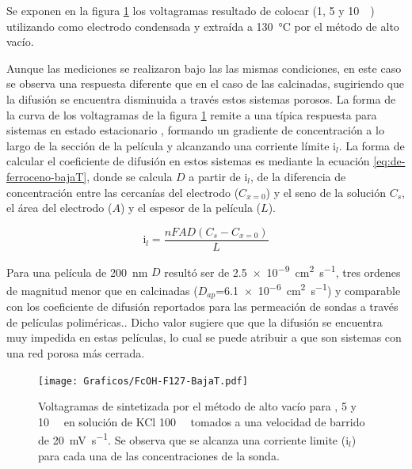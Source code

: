 		Se exponen en la figura \ref{fig:fcoh_bajaT} los voltagramas resultado de colocar \fc\space (1, 5 y \SI{10}{\milli\Molar}) utilizando como electrodo \pdmF\space condensada y extraída a \SI{130}{\celsius} por el método de alto vacío. 
			
		Aunque las mediciones se realizaron bajo las las mismas condiciones, en este caso se observa una respuesta diferente que en el caso de las \pdmF\space calcinadas, sugiriendo que la difusión se encuentra disminuida a través estos sistemas porosos. La forma de la curva de los voltagramas de la figura \ref{fig:fcoh_bajaT} remite a una típica respuesta para sistemas en estado estacionario	, formando un gradiente de concentración a lo largo de la sección de la película y alcanzando una corriente límite $\text{i}_l$. 
		La forma de calcular el coeficiente de difusión en estos sistemas es mediante la ecuación \ref{eq:de-ferroceno-bajaT}, donde se calcula $D$ a partir de $\text{i}_l$, de la diferencia de concentración entre las cercanías del electrodo ($C_{x=0}$) y el seno de la solución $C_s$, el área del electrodo ($A$) y el espesor de la película ($L$).

			\begin{equation}
					\text{i}_l = \frac{nFAD(C_{s}-C_{x=0})}{L}
					\label{eq:de-ferroceno-bajaT}
			\end{equation}
			  	

		Para una película de \SI{200}{nm} $D$ resultó ser de \SI{2.5e-9}{\square\cm\per\second}, tres ordenes de magnitud menor que en \pdmF\space calcinadas ($D_{ap}$=\SI{6,1e-6}{\square\cm\per\second}) y comparable con los coeficiente de difusión reportados para las permeación de sondas a través de películas poliméricas.\cite{Kolb1993}. Dicho valor sugiere que que la difusión se encuentra muy impedida en estas películas, lo cual se puede atribuir a que son sistemas con una red porosa más cerrada. 
				
				\begin{figure}[h!]
				\centering
		 	    \texttt{[image: Graficos/FcOH-F127-BajaT.pdf]}
		        \caption[Voltagrama para \fc\space en \pdm\space de baja temperatura]{Voltagramas de \pdmF\space sintetizada por el método de alto vacío para \fc{}, 5 y \SI{10}{\milli\Molar} en solución de KCl \SI{100}{\milli\Molar} tomados a una velocidad de barrido de \SI{20}{\milli\volt\per\second}. Se observa que se alcanza una corriente limite ($\text{i}_l$) para cada una de las concentraciones de la sonda.}
		        \label{fig:fcoh_bajaT}
		      	\end{figure}

